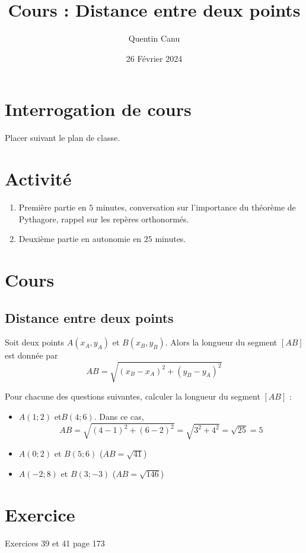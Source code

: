 \documentclass{article}
\title{Cours : Distance entre deux points}
\author{Quentin Canu}
\date{26 Février 2024}
\begin{document}
\maketitle
\section{Interrogation de cours}
Placer suivant le plan de classe.
\section{Activité}
\begin{enumerate}
\item Première partie en $5$ minutes, conversation sur l'importance du théorème de Pythagore, rappel sur les repères orthonormés.
\item Deuxième partie en autonomie en $25$ minutes. 
\end{enumerate}
\section{Cours}
\subsection*{Distance entre deux points}
\begin{proposition}
Soit deux points $A(x_A,y_A)$ et $B(x_B,y_B)$. Alors la longueur du segment $[AB]$ est donnée par
\begin{equation*}
AB = \sqrt{(x_B - x_A)^2 + (y_B - y_A)^2}
\end{equation*}
\end{proposition}
\begin{example}
Pour chacune des questions suivantes, calculer la longueur du segment $[AB]$ :
\begin{itemize}
\item $A(1;2)$ et$B(4;6)$. Dans ce cas,
\begin{equation*}
AB = \sqrt{(4 - 1)^2 + (6 - 2)^2} = \sqrt{3^2 + 4^2} = \sqrt{25} = 5
\end{equation*}
\item $A(0;2)$ et $B(5;6)$ ($AB = \sqrt{41}$)
\item $A(-2;8)$ et $B(3;-3)$ ($AB = \sqrt{146}$)
\end{itemize}
\end{example}
\section{Exercice}
Exercices 39 et 41 page 173
\end{document}
